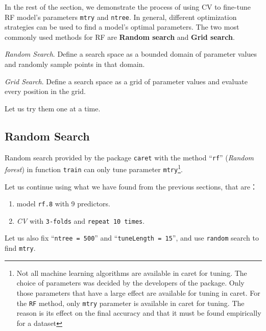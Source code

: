 \documentclass[
]{book}
\providecommand{\tightlist}{%
  \setlength{\itemsep}{0pt}\setlength{\parskip}{0pt}}
\begin{document}
In the rest of the section, we demonstrate the process of using CV to fine-tune RF model's parameters \texttt{mtry} and \texttt{ntree}. In general, different optimization strategies can be used to find a model's optimal parameters. The two most commonly used methods for RF are \textbf{Random search} and \textbf{Grid search}.

\emph{Random Search}. Define a search space as a bounded domain of parameter values and randomly sample points in that domain.

\emph{Grid Search}. Define a search space as a grid of parameter values and evaluate every position in the grid.

Let us try them one at a time.

\hypertarget{random-search}{%
\subsection*{Random Search}\label{random-search}}


Random search provided by the package \texttt{caret} with the method ``\texttt{rf}'' (\emph{Random forest}) in function \texttt{train} can only tune parameter \texttt{mtry}\footnote{Not all machine learning algorithms are available in caret for tuning. The choice of parameters was decided by the developers of the package. Only those parameters that have a large effect are available for tuning in caret. For the \texttt{RF} method, only \texttt{mtry} parameter is available in caret for tuning. The reason is its effect on the final accuracy and that it must be found empirically for a dataset}.

Let us continue using what we have found from the previous sections, that are：

\begin{enumerate}
\def\labelenumi{\arabic{enumi}.}
\tightlist
\item
  model \texttt{rf.8} with 9 predictors.
\item
  \emph{CV} with \texttt{3-folds} and \texttt{repeat\ 10\ times}.
\end{enumerate}

Let us also fix ``\texttt{ntree\ =\ 500}'' and ``\texttt{tuneLength\ =\ 15}'', and use \texttt{random} search to find \texttt{mtry}.
\end{document}
